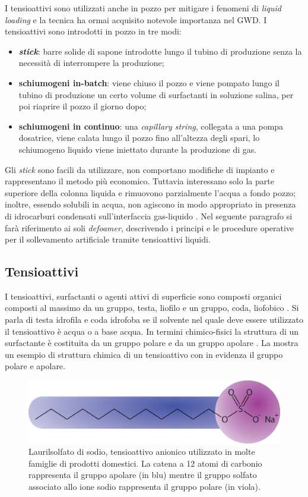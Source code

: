 I tensioattivi sono utilizzati anche in pozzo per mitigare i fenomeni di \textit{liquid loading} e la tecnica ha ormai acquisito notevole importanza nel GWD. I tensioattivi sono introdotti in pozzo in tre modi:
\begin{itemize}
    \item \textit{\textbf{stick}}: barre solide di sapone introdotte lungo il tubino di produzione senza la necessità di interrompere la produzione;
    \item \textbf{schiumogeni in-batch}: viene chiuso il pozzo e viene pompato lungo il tubino di produzione un certo volume di surfactanti in soluzione salina, per poi riaprire il pozzo il giorno dopo;
    \item \textbf{schiumogeni in continuo}: una \textit{capillary string}, collegata a una pompa dosatrice, viene calata lungo il pozzo fino all'altezza degli spari, lo schiumogeno liquido viene iniettato durante la produzione di gas.
\end{itemize}
 Gli \textit{stick} sono facili da utilizzare, non comportano modifiche di impianto e rappresentano il metodo più economico. Tuttavia interessano solo la parte superiore della colonna liquida e rimuovono parzialmente l'acqua a fondo pozzo; inoltre, essendo solubili in acqua, non agiscono in modo appropriato in presenza di idrocarburi condensati sull'interfaccia gas-liquido \parencite{bolding2007resurrecting}. Nel seguente paragrafo si farà riferimento ai soli \textit{defoamer}, descrivendo i principi e le procedure operative per il sollevamento artificiale tramite tensioattivi liquidi.
 
\subsection{Tensioattivi}
I tensioattivi, surfactanti o agenti attivi di superficie sono composti organici composti al massimo da un gruppo, testa, liofilo e un gruppo, coda, liofobico . Si parla di testa idrofila e coda idrofoba se il solvente nel quale deve essere utilizzato il tensioattivo è acqua o a base acqua. In termini chimico-fisici la struttura di un surfactante è costituita da un gruppo polare e da un gruppo apolare . La  mostra un esempio di struttura chimica di un tensioattivo con in evidenza il gruppo polare e apolare.

\begin{figure}[htbp]
    \centering
    \includegraphics[width=.8\textwidth]{fig/foamer/sls.eps}
    \caption{Laurilsolfato di sodio, tensioattivo anionico utilizzato in molte famiglie di prodotti domestici. La catena a 12 atomi di carbonio rappresenta il gruppo apolare (in blu) mentre il gruppo solfato associato allo ione sodio rappresenta il gruppo polare (in viola).}
    \label{fig:sls}
\end{figure}

